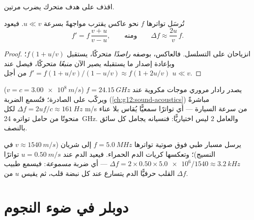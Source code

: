 اقذف  على هدف متحرك يضرب  مرتين.

\begin{proposition}\label{prop:g12:doppler-effect:double}
تُرسَل  تواترها $f$ نحو عاكس يقترب مواجهةً بسرعة $u \ll v$.
فيعود  
\[ f' = f\,\frac{v + u}{v - u}, \qquad \text{ومنه} \qquad \Delta f \approx \frac{2u}{v}\,f . \]
\end{proposition}

\begin{proof}
انزياحان على التسلسل. فالعاكس، بوصفه \emph{راصدًا} متحركًا، يستقبل $f(1 + u/v)$؛
وبإعادة إصدار ما يستقبله يصير الآن \emph{منبعًا} متحركًا، فيصل  عند
$f' = f(1 + u/v)/(1 - u/v) \approx f(1 + 2u/v)$ من أجل $u \ll v$.
\end{proof}

\begin{example}\label{ex:g12:doppler-effect:radar}
يصدر رادار مروري موجات مكروية عند $f = \qty{24.15}{GHz}$ ($v = c = \qty{3.00e8}{m/s}$)
ويركّب  على  الصادرة؛ فتُسمع الضربة (\cref{ch:g12:sound-acoustics})
مباشرةً $\Delta f = 2uf/c \approx \qty{161}{Hz}$ لكل \unit{m/s} من سرعة السيارة
--- أي تواترًا سمعيًّا يُقاس بلا عناء منحوتًا من حامل تواتره \qty{24}{GHz}. والعامل
$2$ ليس اختياريًّا: فنسيانه يجامل كل سائق بالنصف.
\end{example}

\begin{example}\label{ex:g12:doppler-effect:ultrasound}
يرسل مسبار طبي  فوق صوتية تواترها $f = \qty{5.0}{MHz}$ إلى شريان
($v \approx \qty{1540}{m/s}$ في النسيج)؛ وتعكسها كريات الدم الحمراء. فيعيد الدم عند
$u = \qty{0.50}{m/s}$ تواترًا $\Delta f = 2 \times 0.50 \times \num{5.0e6}/1540 \approx
\qty{3.2}{kHz}$ --- أي ضربة \emph{مسموعة}: فيسمع طبيب القلب حرفيًّا الدم
يتسارع عند كل نبضة قلب، ثم يقيس $u$ من $\Delta f$.
\end{example}

\section{دوبلر في ضوء النجوم}

